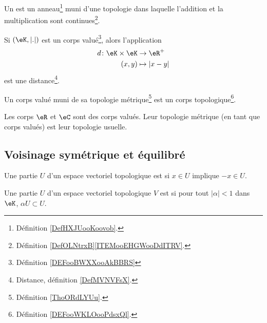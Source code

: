 \begin{definition}      \label{DEFooWKLOooPdsxQl}
	Un  est un anneau\footnote{Définition \ref{DefHXJUooKoovob}.} muni d'une topologie dans laquelle l'addition et la multiplication sont continues\footnote{Définition \ref{DefOLNtrxB}\ref{ITEMooEHGWooDdITRV}.}.
\end{definition}

\begin{propositionDef}      \label{PROPooAWAKooKRmbGT}
	Si \( (\eK, | . |)\) est un corps valué\footnote{Définition \ref{DEFooBWXXooAkBBRS}}, alors l'application
	\begin{equation}
		\begin{aligned}
			d\colon \eK\times \eK & \to \eR^+       \\
			(x,y)                 & \mapsto | x-y |
		\end{aligned}
	\end{equation}
	est une distance\footnote{Distance, définition \ref{DefMVNVFsX}.}.

	Un corps valué muni de sa topologie métrique\footnote{Définition \ref{ThoORdLYUu}.} est un corps topologique\footnote{Définition \ref{DEFooWKLOooPdsxQl}.}.
\end{propositionDef}

\begin{lemma}       \label{LEMooCHDTooZsgXEK}
	Les corps \( \eR\) et \( \eC\) sont des corps valués. Leur topologie métrique (en tant que corps valués) est leur topologie usuelle.
\end{lemma}

\subsection{Voisinage symétrique et équilibré}

\begin{definition}
	Une partie \( U\) d'un espace vectoriel topologique est  si \( x\in U\) implique \( -x\in U\).
\end{definition}

\begin{definition}
	Une partie \( U\) d'un espace vectoriel topologique \( V\) est  si pour tout \( | \alpha |<1\) dans \( \eK\), \( \alpha U\subset U\).
\end{definition}

